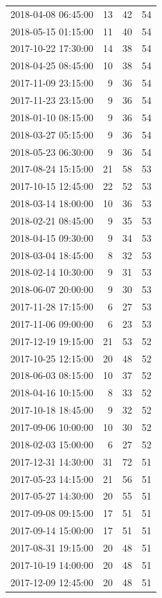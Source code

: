 \begin{tabular}{lrrr}
2018-04-08 06:45:00 & 13 & 42 & 54 \\
2018-05-15 01:15:00 & 11 & 40 & 54 \\
2017-10-22 17:30:00 & 14 & 38 & 54 \\
2018-04-25 08:45:00 & 10 & 38 & 54 \\
2017-11-09 23:15:00 & 9 & 36 & 54 \\
2017-11-23 23:15:00 & 9 & 36 & 54 \\
2018-01-10 08:15:00 & 9 & 36 & 54 \\
2018-03-27 05:15:00 & 9 & 36 & 54 \\
2018-05-23 06:30:00 & 9 & 36 & 54 \\
2017-08-24 15:15:00 & 21 & 58 & 53 \\
2017-10-15 12:45:00 & 22 & 52 & 53 \\
2018-03-14 18:00:00 & 10 & 36 & 53 \\
2018-02-21 08:45:00 & 9 & 35 & 53 \\
2018-04-15 09:30:00 & 9 & 34 & 53 \\
2018-03-04 18:45:00 & 8 & 32 & 53 \\
2018-02-14 10:30:00 & 9 & 31 & 53 \\
2018-06-07 20:00:00 & 9 & 30 & 53 \\
2017-11-28 17:15:00 & 6 & 27 & 53 \\
2017-11-06 09:00:00 & 6 & 23 & 53 \\
2017-12-19 19:15:00 & 21 & 53 & 52 \\
2017-10-25 12:15:00 & 20 & 48 & 52 \\
2018-06-03 08:15:00 & 10 & 37 & 52 \\
2018-04-16 10:15:00 & 8 & 33 & 52 \\
2017-10-18 18:45:00 & 9 & 32 & 52 \\
2017-09-06 10:00:00 & 10 & 30 & 52 \\
2018-02-03 15:00:00 & 6 & 27 & 52 \\
2017-12-31 14:30:00 & 31 & 72 & 51 \\
2017-05-23 14:15:00 & 21 & 56 & 51 \\
2017-05-27 14:30:00 & 20 & 55 & 51 \\
2017-09-08 09:15:00 & 17 & 51 & 51 \\
2017-09-14 15:00:00 & 17 & 51 & 51 \\
2017-08-31 19:15:00 & 20 & 48 & 51 \\
2017-10-19 14:00:00 & 20 & 48 & 51 \\
2017-12-09 12:45:00 & 20 & 48 & 51 \\

\end{tabular}

